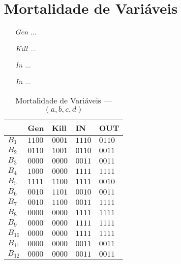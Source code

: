 \section{Mortalidade de Vari\'aveis}

\begin{itemize}
  \item[$Gen$] ...
  \item[$Kill$] ...
  \item[$In$] ...
  \item[$In$] ...
\end{itemize}

\begin{table}[ht]
\centering
\begin{tabular}{l|l|l|l|l}
	& Gen & Kill & IN & OUT\\
\hline
$B_{1}$ &  $1100$ & $0001$ & $1110$ & $0110$\\
$B_{2}$ &  $0110$ & $1001$ & $0110$ & $0011$\\
$B_{3}$ &  $0000$ & $0000$ & $0011$ & $0011$\\
$B_{4}$ &  $1000$ & $0000$ & $1111$ & $1111$\\
$B_{5}$ &  $1111$ & $1100$ & $1111$ & $0010$\\
$B_{6}$ &  $0010$ & $1101$ & $0010$ & $0011$\\
$B_{7}$ &  $0010$ & $1100$ & $0011$ & $1111$\\
$B_{8}$ &  $0000$ & $0000$ & $1111$ & $1111$\\
$B_{9}$ &  $0000$ & $0000$ & $1111$ & $1111$\\
$B_{10}$ &  $0000$ & $0000$ & $1111$ & $1111$\\
$B_{11}$ &  $0000$ & $0000$ & $0011$ & $0011$\\
$B_{12}$ &  $0000$ & $0000$ & $0011$ & $0011$\\
\end{tabular}
\caption{Mortalidade de Vari\'aveis --- $(a, b, c, d)$}
\end{table}

